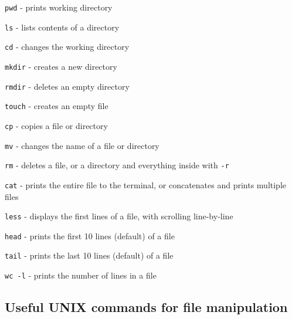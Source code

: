 \documentclass[
]{book}
\begin{document}
\texttt{pwd} - prints working directory

\texttt{ls} - lists contents of a directory

\texttt{cd} - changes the working directory

\texttt{mkdir} - creates a new directory

\texttt{rmdir} - deletes an empty directory

\texttt{touch} - creates an empty file

\texttt{cp} - copies a file or directory

\texttt{mv} - changes the name of a file or directory

\texttt{rm} - deletes a file, or a directory and everything inside with \texttt{-r}

\texttt{cat} - prints the entire file to the terminal, or concatenates and prints multiple files

\texttt{less} - displays the first lines of a file, with scrolling line-by-line

\texttt{head} - prints the first 10 lines (default) of a file

\texttt{tail} - prints the last 10 lines (default) of a file

\texttt{wc\ -l} - prints the number of lines in a file

\hypertarget{useful-unix-commands-for-file-manipulation}{%
\subsection{Useful UNIX commands for file manipulation}\label{useful-unix-commands-for-file-manipulation}}
\end{document}
